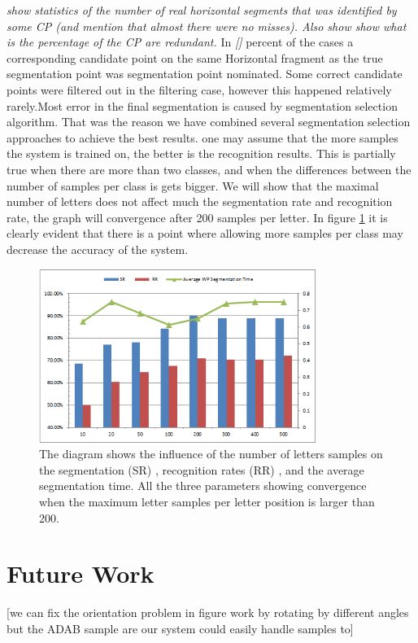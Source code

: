 \documentclass[journal,compsoc]{IEEEtran}
\begin{document}
\emph{ show statistics of the number of real horizontal segments that was identified by some CP (and mention that almost there were no misses). Also show show what is the percentage of the CP are redundant.}
In \emph{[]} percent of the cases a corresponding candidate point on the same Horizontal fragment as the true segmentation point was  segmentation point nominated. Some correct candidate points were filtered out in the filtering case, however this happened relatively rarely.Most error in the final segmentation is caused by segmentation selection algorithm. That was the reason we have combined several segmentation selection approaches to achieve the best results.
one may assume that the more samples the system is trained on, the better is the recognition results. This is partially true when there are more than two classes, and when the differences between the number of samples per class is gets bigger.
We will show that the maximal number of letters does not affect much the segmentation rate and recognition rate, the graph will convergence after 200 samples per letter. In figure \ref{fig:num_letter_impact} it is clearly evident that there is a point where allowing more samples per class may decrease the accuracy of the system.

\begin{figure}[h]
\centering
\includegraphics[width=9cm]{./figures/num_letter_impact}
\caption{The diagram shows the influence of the number of letters samples on the segmentation (SR) , recognition rates (RR) , and the average segmentation time. All the three parameters showing convergence when the maximum letter samples per letter position is larger than 200. }
\label{fig:num_letter_impact}
\end{figure}


\section{Future Work}
\label{sec:future_work}
[we can fix the orientation problem in figure work by rotating by different angles but the ADAB sample are our system could easily handle samples to]
\end{document}
